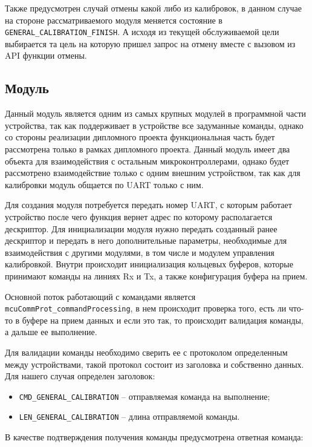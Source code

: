 Также предусмотрен случай отмены какой либо из калибровок, в данном случае на стороне рассматриваемого модуля меняется состояние в \lstinline{GENERAL_CALIBRATION_FINISH}.
А исходя из текущей обслуживаемой цели выбирается та цель на которую пришел запрос на отмену вместе с вызовом из API функции отмены.

\subsection{Модуль \moduleUart}

Данный модуль является одним из самых крупных модулей в программной части устройства, так как поддерживает в устройстве все задуманные команды, 
однако со стороны реализации дипломного проекта функциональная часть будет рассмотрена только в рамках дипломного проекта. Данный модуль имеет
два объекта для взаимодействия с остальным микроконтроллерами, однако будет рассмотрено взаимодействие только с одним внешним устройством, так как
для калибровки модуль общается по UART только с ним. 

Для создания модуля потребуется передать номер UART, с которым работает устройство после чего функция вернет адрес по которому располагается дескриптор.
Для инициализации модуля нужно передать созданный ранее дескриптор и передать в него дополнительные параметры, необходимые для взаимодействия с другими модулями,
в том числе и модулем управления калибровкой. Внутри происходит инициализация кольцевых буферов, которые принимают команды на линиях Rx и Tx, а также конфигурация
буфера на прием.

Основной поток работающий с командами является \lstinline{mcuCommProt_commandProcessing}, в нем происходит проверка того, есть ли что-то в буфере на прием данных
и если это так, то происходит валидация команды, а дальше ее выполнение.

Для валидации команды необходимо сверить ее с протоколом определенным между устройствами, такой протокол состоит из заголовка и собственно данных. Для нашего случая
определен заголовок: 

\begin{itemize}
    \item \lstinline{CMD_GENERAL_CALIBRATION} -- отправляемая команда на выполнение;
    \item \lstinline{LEN_GENERAL_CALIBRATION} -- длина отправляемой команды.
\end{itemize}

В качестве подтверждения получения команды предусмотрена ответная команда: 

